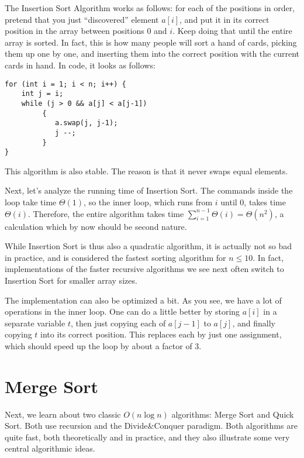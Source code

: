 The Insertion Sort Algorithm works as follows: for each
of the positions in order, pretend that you just ``discovered''
element $a[i]$, and put it in its correct position in the array
between positions $0$ and $i$. Keep doing that until the entire array
is sorted. In fact, this is how many people will sort a hand of cards,
picking them up one by one, and inserting them into the correct
position with the current cards in hand. In code, it looks as follows:

\begin{verbatim}
for (int i = 1; i < n; i++) {
    int j = i;
    while (j > 0 && a[j] < a[j-1])
         { 
            a.swap(j, j-1);
            j --;
         }   
}
\end{verbatim}

This algorithm is also stable. The reason is that it never swaps equal
elements. 

Next, let's analyze the running time of Insertion Sort. 
The commands inside the  loop take time $\Theta(1)$, so
the inner  loop, which runs from $i$ until $0$, takes time
$\Theta(i)$. Therefore, the entire algorithm takes time
$\sum_{i=1}^{n-1} \Theta(i) = \Theta(n^2)$, a calculation which by now
should be second nature.

While Insertion Sort is thus also a quadratic algorithm, it is
actually not so bad in practice, and is considered the fastest sorting
algorithm for $n \leq 10$. In fact, implementations of the faster
recursive algorithms we see next often switch to Insertion Sort for
smaller array sizes.

The implementation can also be optimized a bit. As you see, we have a
lot of  operations in the inner loop. One can do a little
better by storing $a[i]$ in a separate variable $t$, then just copying
each of $a[j-1]$ to $a[j]$, and finally copying $t$ into its correct
position. This replaces each  by just one assignment, which
should speed up the loop by about a factor of 3.

\section{Merge Sort}

Next, we learn about two classic $O(n \log n)$ algorithms: Merge Sort
and Quick Sort. Both use recursion and the Divide\&{}Conquer paradigm.
Both algorithms are quite fast, both theoretically and in practice,
and they also illustrate some very central algorithmic ideas. 


